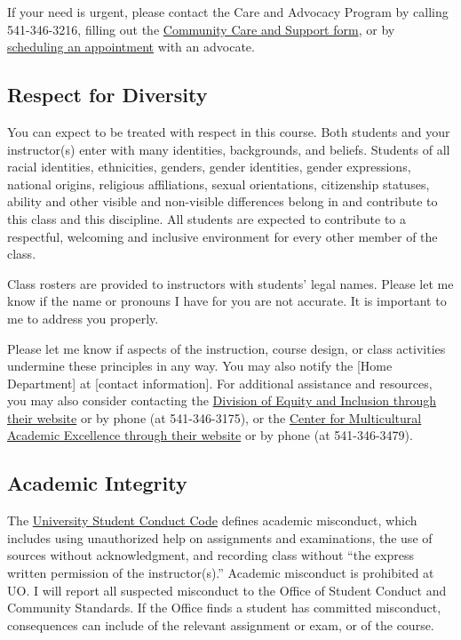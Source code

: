 \documentclass[
  letterpaper,
  DIV=11,
  numbers=noendperiod]{scrartcl}
\begin{document}
If your need is urgent, please contact the Care and Advocacy Program by
calling 541-346-3216, filling out the
\href{https://cm.maxient.com/reportingform.php?UnivofOregon\&layout_id=1}{Community
Care and Support form}, or by
\href{https://outlook.office365.com/owa/calendar/CareandAdvocacyProgram@uoregon.edu/bookings/}{scheduling
an appointment} with an advocate.

\hypertarget{respect-for-diversity}{%
\subsection{Respect for Diversity}\label{respect-for-diversity}}

You can expect to be treated with respect in this course. Both students
and your instructor(s) enter with many identities, backgrounds, and
beliefs. Students of all racial identities, ethnicities, genders, gender
identities, gender expressions, national origins, religious
affiliations, sexual orientations, citizenship statuses, ability and
other visible and non-visible differences belong in and contribute to
this class and this discipline. All students are expected to contribute
to a respectful, welcoming and inclusive environment for every other
member of the class.

Class rosters are provided to instructors with students' legal names.
Please let me know if the name or pronouns I have for you are not
accurate. It is important to me to address you properly.

Please let me know if aspects of the instruction, course design, or
class activities undermine these principles in any way. You may also
notify the {[}Home Department{]} at {[}contact information{]}. For
additional assistance and resources, you may also consider contacting
the \href{http://inclusion.uoregon.edu/}{Division of Equity and
Inclusion through their website} or by phone (at 541-346-3175), or the
\href{https://inclusion.uoregon.edu/center-multicultural-academic-excellence-cmae}{Center
for Multicultural Academic Excellence through their website} or by phone
(at 541-346-3479).

\hypertarget{academic-integrity}{%
\subsection{Academic Integrity}\label{academic-integrity}}

The \href{https://dos.uoregon.edu/conduct}{University Student Conduct
Code} defines academic misconduct, which includes using unauthorized
help on assignments and examinations, the use of sources without
acknowledgment, and recording class without ``the express written
permission of the instructor(s).'' Academic misconduct is prohibited at
UO. I will report all suspected misconduct to the Office of Student
Conduct and Community Standards. If the Office finds a student has
committed misconduct, consequences can include of the relevant
assignment or exam, or of the course.
\end{document}
